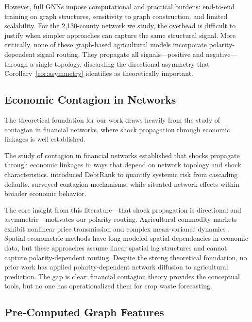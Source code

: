 \documentclass[preprint,12pt,authoryear]{elsarticle}
\begin{document}
However, full GNNs impose computational and practical burdens: end-to-end training on graph structures, sensitivity to graph construction, and limited scalability. For the 2,130-county network we study, the overhead is difficult to justify when simpler approaches can capture the same structural signal. More critically, none of these graph-based agricultural models incorporate polarity-dependent signal routing. They propagate all signals---positive and negative---through a single topology, discarding the directional asymmetry that Corollary~\ref{cor:asymmetry} identifies as theoretically important.

\subsection{Economic Contagion in Networks}

The theoretical foundation for our work draws heavily from the study of contagion in financial networks, where shock propagation through economic linkages is well established.

The study of contagion in financial networks \citep{acemoglu2015systemic,elliott2014financial,gai2010contagion} established that shocks propagate through economic linkages in ways that depend on network topology and shock characteristics. \citet{battiston2012debtrank} introduced DebtRank to quantify systemic risk from cascading defaults. \citet{glasserman2016contagion} surveyed contagion mechanisms, while \citet{jackson2014networks} situated network effects within broader economic behavior.

The core insight from this literature---that shock propagation is directional and asymmetric---motivates our polarity routing. Agricultural commodity markets exhibit nonlinear price transmission \citep{serra2011nonlinear} and complex mean-variance dynamics \citep{harri2011mean}. Spatial econometric methods \citep{lesage2009introduction,anselin2003spatial} have long modeled spatial dependencies in economic data, but these approaches assume linear spatial lag structures and cannot capture polarity-dependent routing. Despite the strong theoretical foundation, no prior work has applied polarity-dependent network diffusion to agricultural prediction. The gap is clear: financial contagion theory provides the conceptual tools, but no one has operationalized them for crop waste forecasting.

\subsection{Pre-Computed Graph Features}
\end{document}
